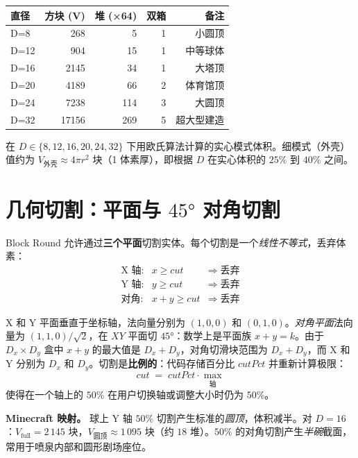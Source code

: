 \documentclass[12pt,a4paper]{scrartcl}
\newcommand{\acc}[1]{\textcolor{accent}{\textbf{#1}}}
\begin{document}
\vspace{0.5em}
\begin{center}
\begin{tabular}{@{}lrrrr@{}}
\toprule
\textbf{直径} & \textbf{方块 (V)} & \textbf{堆 (×64)} & \textbf{双箱} & \textbf{备注} \\
\midrule
D=8   &   268 &  5  & 1 & 小圆顶  \\
D=12  &   904 & 15  & 1 & 中等球体 \\
D=16  &  2145 & 34  & 1 & 大塔顶 \\
D=20  &  4189 & 66  & 2 & 体育馆顶 \\
D=24  &  7238 & 114 & 3 & 大圆顶 \\
D=32  & 17156 & 269 & 5 & 超大型建造 \\
\bottomrule
\end{tabular}
\end{center}

在 $D \in \{8,12,16,20,24,32\}$ 下用欧氏算法计算的实心模式体积。细模式（外壳）值约为 $V_{\mathrm{外壳}} \approx 4\pi r^2$ 块（1 体素厚），即根据 $D$ 在实心体积的 $25\%$ 到 $40\%$ 之间。

\section{几何切割：平面与 $45°$ 对角切割}

Block Round 允许通过\acc{三个平面}切割实体。每个切割是一个\emph{线性不等式}，丢弃体素：
\[
\begin{array}{lcl}
\text{X 轴:}    & x \geq \mathit{cut}      & \Rightarrow\; \text{丢弃} \\
\text{Y 轴:}    & y \geq \mathit{cut}      & \Rightarrow\; \text{丢弃} \\
\text{对角:}  & x + y \geq \mathit{cut}  & \Rightarrow\; \text{丢弃}
\end{array}
\]

X 和 Y 平面垂直于坐标轴，法向量分别为 $(1,0,0)$ 和 $(0,1,0)$。\emph{对角平面}法向量为 $(1,1,0)/\sqrt{2}$，在 $XY$ 平面切 $45°$：数学上是平面族 $x+y = k$。由于 $D_x \times D_y$ 盒中 $x+y$ 的最大值是 $D_x + D_y$，对角切滑块范围为 $D_x + D_y$，而 X 和 Y 分别为 $D_x$ 和 $D_y$。切割是\acc{比例的}：代码存储百分比 $\mathit{cutPct}$ 并重新计算极限：
\[
\mathit{cut} \;=\; \mathit{cutPct} \cdot \max_{\text{轴}}
\]
使得在一个轴上的 $50\%$ 在用户切换轴或调整大小时仍为 $50\%$。

\begin{minec}
\textbf{Minecraft 映射。} 球上 Y 轴 $50\%$ 切割产生标准的\emph{圆顶}，体积减半。对 $D=16$：$V_{\mathrm{full}} = 2\,145$ 块，$V_{\mathrm{圆顶}} \approx 1\,095$ 块（约 $18$ 堆）。$50\%$ 的对角切割产生\emph{半碗}截面，常用于喷泉内部和圆形剧场座位。
\end{minec}
\end{document}
